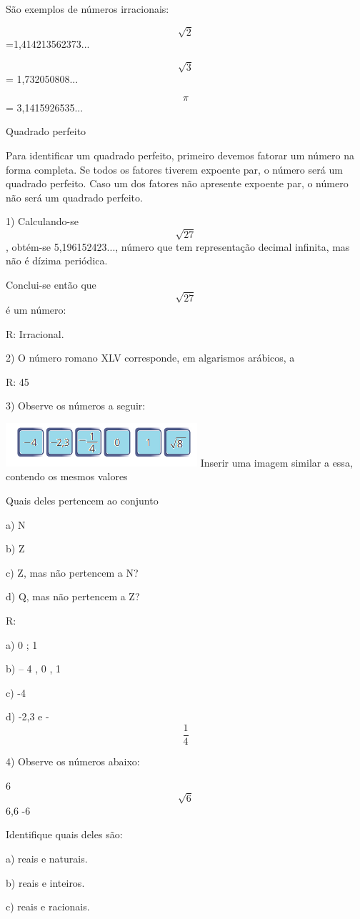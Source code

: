 São exemplos de números irracionais:

\[\sqrt{2}\]=1,414213562373...

\[\sqrt{3}\] = 1,732050808...

\[\pi\] = 3,1415926535...

Quadrado perfeito

Para identificar um quadrado perfeito, primeiro devemos fatorar um
número na forma completa. Se todos os fatores tiverem expoente par, o
número será um quadrado perfeito. Caso um dos fatores não apresente
expoente par, o número não será um quadrado perfeito.


1) Calculando-se \[\sqrt{27}\] , obtém-se 5,196152423..., número que tem
representação decimal infinita, mas não é dízima periódica.

Conclui-se então que \[\sqrt{27}\] é um número:

R: Irracional.

2) O número romano XLV corresponde, em algarismos arábicos, a

R: 45

3) Observe os números a seguir:

\includegraphics[width=2.79167in,height=0.63542in]{./imgSAEB_8_MAT/media/image1.png}
Inserir uma imagem similar a essa, contendo os mesmos valores

Quais deles pertencem ao conjunto

a) N

b) Z

c) Z, mas não pertencem a N?

d) Q, mas não pertencem a Z?

R:

a) 0 ; 1

b) -- 4 , 0 , 1

c) -4

d) -2,3 e - \[\frac{1}{4}\]

4) Observe os números abaixo:

6 \[\sqrt{6}\] 6,6 -6

Identifique quais deles são:

a) reais e naturais.

b) reais e inteiros.

c) reais e racionais.

